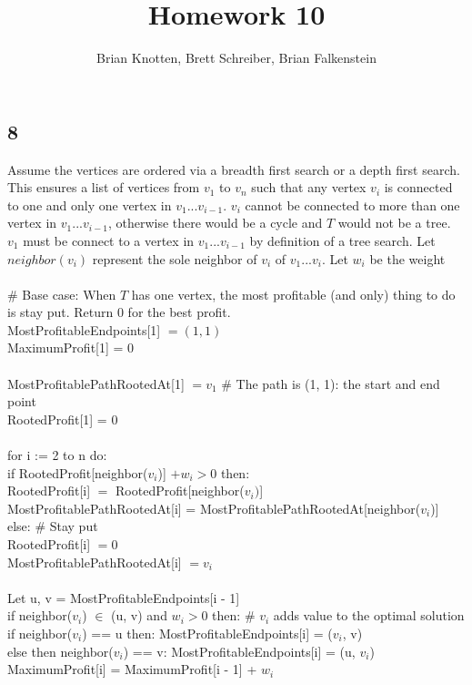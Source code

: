 \documentclass[letterpaper,notitlepage,twoside]{article}
\newcommand\tab[1][1cm]{\hspace*{#1}} %
\begin{document}
\title{Homework 10}
\author{Brian Knotten, Brett Schreiber, Brian Falkenstein}
\maketitle


\subsection*{8}
Assume the vertices are ordered via a breadth first search or a depth first search. This ensures a list of vertices from $v_1$ to $v_n$ such that any vertex $v_i$ is connected to one and only one vertex in $v_1...v_{i-1}$. $v_i$ cannot be connected to more than one vertex in $v_1...v_{i-1}$, otherwise there would be a cycle and $T$ would not be a tree. $v_1$ must be connect to a vertex in $v_1...v_{i-1}$ by definition of a tree search. Let $neighbor(v_i)$ represent the sole neighbor of $v_i$ of $v_1...v_i$. Let $w_i$ be the weight \\
\\
\# Base case: When $T$ has one vertex, the most profitable (and only) thing to do is stay put. Return 0 for the best profit.\\
MostProfitableEndpoints[1] $= (1, 1)$\\
MaximumProfit[1] = 0\\
\\
MostProfitablePathRootedAt[1] $= v_1$ \# The path is (1, 1): the start and end point\\
RootedProfit[1] = 0\\
\\
for i := 2 to n do: \\
\tab if RootedProfit[neighbor($v_i$)]  $+ w_i > 0$ then: \\
\tab\tab RootedProfit[i] $=$ RootedProfit[neighbor($v_i)$] \\
\tab\tab MostProfitablePathRootedAt[i] =  MostProfitablePathRootedAt[neighbor($v_i$)] \\
\tab else: \# Stay put \\
\tab\tab RootedProfit[i] $= 0$ \\
\tab\tab MostProfitablePathRootedAt[i] $= v_i$ \\
\\
Let u, v = MostProfitableEndpoints[i - 1]\\
\tab if neighbor($v_i$) $\in$ (u, v) and $w_i > 0$ then: \# $v_i$ adds value to the optimal solution\\
\tab\tab if neighbor($v_i$) == u then: MostProfitableEndpoints[i] = ($v_i$, v)\\
\tab\tab else then neighbor($v_i$) == v: MostProfitableEndpoints[i] = (u, $v_i$)\\
\tab MaximumProfit[i] = MaximumProfit[i - 1] + $w_i$\\
\end{document}
